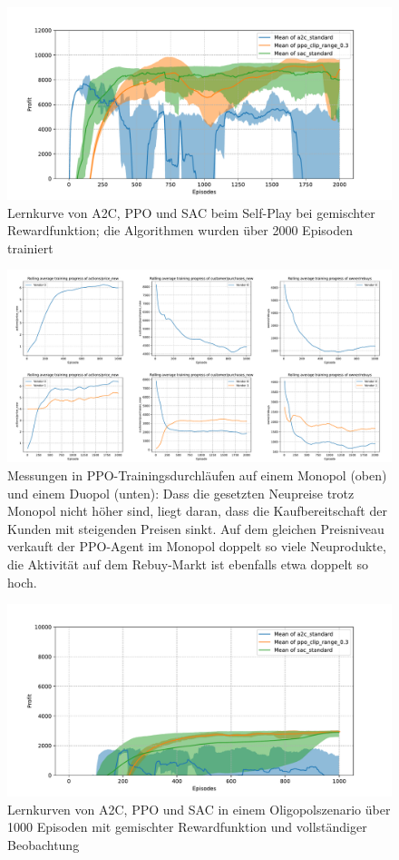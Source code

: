 \begin{figure}[htbp]
	\centering
	\includegraphics[width=\textwidth]{appendix/self_play_mixed.pdf}
	\caption{Lernkurve von A2C, PPO und SAC beim Self-Play bei gemischter Rewardfunktion; die Algorithmen wurden über 2000 Episoden trainiert}
	\label{graphic:SelfPlayMixedLearningCurve}
\end{figure}
\begin{figure}[htbp]
	\centering
	\includegraphics[width=\textwidth]{appendix/ppo_monopoly_vs_doupoly.pdf}
	\caption{
		Messungen in PPO-Trainingsdurchläufen auf einem Monopol (oben) und einem Duopol (unten):
		Dass die gesetzten Neupreise trotz Monopol nicht höher sind, liegt daran, dass die Kaufbereitschaft der Kunden mit steigenden Preisen sinkt.
		Auf dem gleichen Preisniveau verkauft der PPO-Agent im Monopol doppelt so viele Neuprodukte, die Aktivität auf dem Rebuy-Markt ist ebenfalls etwa doppelt so hoch.
	}
	\label{graphic:PPOMonopolyDuopoly}
\end{figure}
\begin{figure}[htbp]
	\centering
	\includegraphics[width=\textwidth]{appendix/comparison_oligopoly_mixed.pdf}
	\caption{Lernkurven von A2C, PPO und SAC in einem Oligopolszenario über 1000 Episoden mit gemischter Rewardfunktion und vollständiger Beobachtung}
	\label{graphic:OligopolyMixedComparison}
\end{figure}